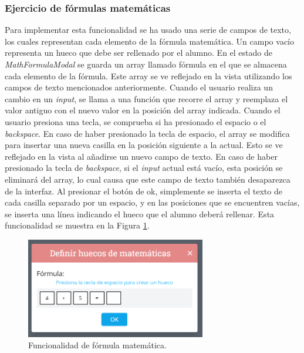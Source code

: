 \subsubsection{Ejercicio de fórmulas matemáticas}
Para implementar esta funcionalidad se ha usado una serie de campos de texto, los cuales representan cada elemento de la fórmula matemática. Un campo vacío representa un hueco que debe ser rellenado por el alumno. En el estado de \textit{MathFormulaModal} se guarda un array llamado fórmula en el que se almacena cada elemento de la fórmula. Este array se ve reflejado en la vista utilizando los campos de texto mencionados anteriormente. Cuando el usuario realiza un cambio en un \textit{input}, se llama a una función que recorre el array y reemplaza el valor antiguo con el nuevo valor en la posición del array indicada. Cuando el usuario presiona una tecla, se comprueba si ha presionado el espacio o el \textit{backspace}. En caso de haber presionado la tecla de espacio, el array se modifica para insertar una nueva casilla en la posición siguiente a la actual. Esto se ve reflejado en la vista al añadirse un nuevo campo de texto. En caso de haber presionado la tecla de \textit{backspace}, si el \textit{input} actual está vacío, esta posición se eliminará del array, lo cual causa que este campo de texto también desaparezca de la interfaz. Al presionar el botón de ok, simplemente se inserta el texto de cada casilla separado por un espacio, y en las posiciones que se encuentren vacías, se inserta una línea indicando el hueco que el alumno deberá rellenar. Esta funcionalidad se muestra en la Figura \ref{fig:funcionalidadFormulaMatematica}.

\begin{figure}[ht!]
  \centering
  \includegraphics[width=0.7\textwidth]{Imagenes/Implementacion/MathFormulaModal.PNG}
  \caption{Funcionalidad de fórmula matemática.}
  \label{fig:funcionalidadFormulaMatematica}
\end{figure}

